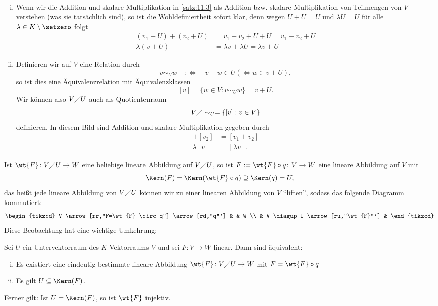 \begin{bemerkung}
	\label{bem:11.4}
	\mbox{} \\[-1.4cm]
	\begin{enumerate}[(i)]
		\item Wenn wir die Addition und skalare Multiplikation in \autoref{satz:11.3} als Addition bzw. skalare Multiplikation von Teilmengen von $V$ verstehen (was sie tatsächlich sind), so ist die Wohldefiniertheit sofort klar, denn wegen $U+U = U$ und $\lambda U = U$ für alle $\lambda \in K \setminus \setzero$ folgt
		\begin{align*}
			(v_1+U)+(v_2+U) &= v_1+v_2+U+U = v_1 + v_2 + U \\
			\lambda(v+U) &= \lambda v + \lambda U = \lambda v + U
		\end{align*}
		\item Definieren wir auf $V$ eine Relation durch
		\[
			v \sim_U w \quad :\Leftrightarrow \quad v-w \in U (\Leftrightarrow w \in v+U),
		\]
		so ist dies eine Äquivalenzrelation mit Äquivalenzklassen 
		\[
			[v] = \{w \in V : v \sim_U w\} = v + U.
		\]
		Wir können also $V \diagup U$ auch als Quotientenraum
		\[
			V \diagup \sim_U = \{ [v] : v \in V\}
		\]
		definieren.
		In diesem Bild sind Addition und skalare Multiplikation gegeben durch
		\begin{align*}
			[v_1] + [v_2] &= [v_1 + v_2] \\
			\lambda [v] &= [\lambda v].
		\end{align*}
	\end{enumerate}
\end{bemerkung}

\begin{bemerkung}
	\label{bem:11.5}
	Ist $\wt{F}\colon V \diagup U \rightarrow W$ eine beliebige lineare Abbildung auf $V \diagup U$, so ist $F := \wt{F} \circ q \colon V \rightarrow W$ eine lineare Abbildung auf $V$ mit
	\[
		\Kern(F) = \Kern(\wt{F} \circ q) \supseteq \Kern(q) = U,
	\]
	das heißt jede lineare Abbildung von $V \diagup U$ können wir zu einer linearen Abbildung von $V$ \enquote{liften}, sodass das folgende Diagramm kommutiert:
	\[
		\begin{tikzcd}
			V \arrow[rr,"F=\wt{F} \circ q"] \arrow[rd,"q"'] & & W \\
			& V \diagup U \arrow[ru,"\wt{F}"'] &
		\end{tikzcd}
	\]
	Diese Beobachtung hat eine wichtige Umkehrung:
\end{bemerkung}

\begin{satz}[Homomorphiesatz]
	\label{satz:11.6}
	Sei $U$ ein Untervektorraum des $K$-Vektorraums $V$ und sei $F \colon V \rightarrow W$ linear.
	Dann sind äquivalent: 
	\begin{enumerate}[(i)]
		\item Es existiert eine eindeutig bestimmte lineare Abbildung $\wt{F} \colon V \diagup U \rightarrow W$ mit $F = \wt{F} \circ q$
		\item Es gilt $U \subseteq \Kern(F)$.
	\end{enumerate}
	Ferner gilt:
	Ist $U = \Kern(F)$, so ist $\wt{F}$ injektiv.
\end{satz}

